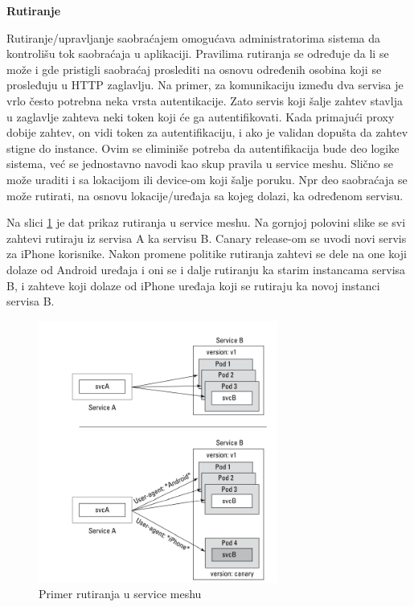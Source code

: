 \documentclass[a4paper,12pt]{report}
\begin{document}
\textbf{Rutiranje}\newline

Rutiranje/upravljanje saobraćajem omogućava administratorima sistema da kontrolišu tok saobraćaja u aplikaciji. Pravilima rutiranja se određuje da li se može i gde pristigli saobraćaj proslediti na osnovu određenih osobina koji se prosleđuju u HTTP zaglavlju. Na primer, za komunikaciju između dva servisa je vrlo često potrebna neka vrsta autentikacije. Zato servis koji šalje zahtev stavlja u zaglavlje zahteva neki token koji će ga autentifikovati. Kada primajući proxy dobije zahtev, on vidi token za autentifikaciju, i ako je validan dopušta da zahtev stigne do instance. Ovim se eliminiše potreba da autentifikacija bude deo logike sistema, već se jednostavno navodi kao skup pravila u service meshu. Slično se može uraditi i sa lokacijom ili device-om koji šalje poruku. Npr deo saobraćaja se može rutirati, na osnovu lokacije/uređaja sa kojeg dolazi, ka određenom servisu.\newline

Na slici \ref{fig:routing-example} je dat prikaz rutiranja u service meshu. Na gornjoj polovini slike se svi zahtevi rutiraju iz servisa A ka servisu B. Canary release-om se uvodi novi servis za iPhone korisnike. Nakon promene politike rutiranja zahtevi se dele na one koji dolaze od Android uređaja i oni se i dalje rutiranju ka starim instancama servisa B, i zahteve koji dolaze od iPhone uređaja koji se rutiraju ka novoj instanci servisa B. \newline

\begin{figure}[h]
    \centering
    \includegraphics[width=0.7\textwidth]{routing_example}
    \caption{Primer rutiranja u service meshu}
    \label{fig:routing-example}
\end{figure} 
\end{document}
